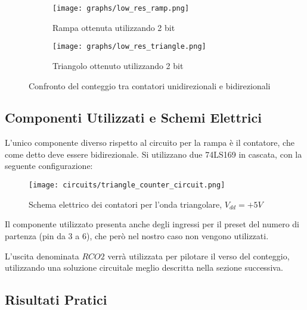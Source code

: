 \begin{figure}[ht]
    \centering

    \begin{subfigure}{.5\textwidth}
        \centering
        \texttt{[image: graphs/low\_res\_ramp.png]}
        \caption{Rampa ottenuta utilizzando 2 bit}
    \end{subfigure}%
    \begin{subfigure}{.5\textwidth}
        \centering
        \texttt{[image: graphs/low\_res\_triangle.png]}
        \caption{Triangolo ottenuto utilizzando 2 bit}
    \end{subfigure}

    \caption{Confronto del conteggio tra contatori unidirezionali e bidirezionali}
    \label{steps}
\end{figure}


\subsection*{Componenti Utilizzati e Schemi Elettrici}

L'unico componente diverso rispetto al circuito per la rampa è il contatore, che come detto
deve essere bidirezionale. Si utilizzano due 74LS169 \cite{74ls169} in cascata, con la seguente
configurazione:
\medskip

\begin{figure}[ht]
    \centering
    \texttt{[image: circuits/triangle\_counter\_circuit.png]}
    \caption{Schema elettrico dei contatori per l'onda triangolare, $V_{dd}=+5V$}
    \label{triangle_counter_circuit}
\end{figure}

Il componente utilizzato presenta anche degli ingressi per il preset del numero di partenza
(pin da 3 a 6), che però nel nostro caso non vengono utilizzati.

L'uscita denominata $RCO2$ verrà utilizzata per pilotare il verso del conteggio, utilizzando
una soluzione circuitale meglio descritta nella sezione successiva.


\subsection*{Risultati Pratici}

